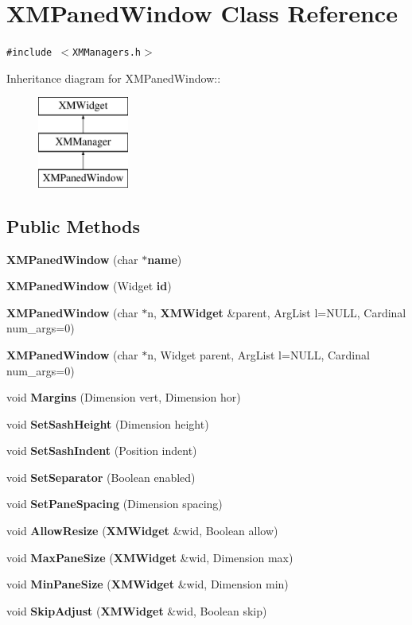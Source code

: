 \section{XMPaned\-Window  Class Reference}
\label{classXMPanedWindow}
{\tt \#include $<$XMManagers.h$>$}

Inheritance diagram for XMPaned\-Window::\begin{figure}[H]
\begin{center}
\leavevmode
\includegraphics[height=3cm]{classXMPanedWindow}
\end{center}
\end{figure}
\subsection*{Public Methods}
\begin{CompactItemize}
\item 
{\bf XMPaned\-Window} (char $\ast${\bf name})
\item 
{\bf XMPaned\-Window} (Widget {\bf id})
\item 
{\bf XMPaned\-Window} (char $\ast$n, {\bf XMWidget} \&parent, Arg\-List l=NULL, Cardinal num\_\-args=0)
\item 
{\bf XMPaned\-Window} (char $\ast$n, Widget parent, Arg\-List l=NULL, Cardinal num\_\-args=0)
\item 
void {\bf Margins} (Dimension vert, Dimension hor)
\item 
void {\bf Set\-Sash\-Height} (Dimension height)
\item 
void {\bf Set\-Sash\-Indent} (Position indent)
\item 
void {\bf Set\-Separator} (Boolean enabled)
\item 
void {\bf Set\-Pane\-Spacing} (Dimension spacing)
\item 
void {\bf Allow\-Resize} ({\bf XMWidget} \&wid, Boolean allow)
\item 
void {\bf Max\-Pane\-Size} ({\bf XMWidget} \&wid, Dimension max)
\item 
void {\bf Min\-Pane\-Size} ({\bf XMWidget} \&wid, Dimension min)
\item 
void {\bf Skip\-Adjust} ({\bf XMWidget} \&wid, Boolean skip)
\end{CompactItemize}



